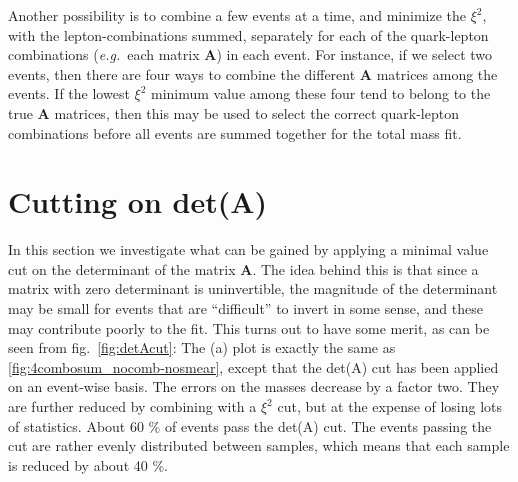 \documentclass[twoside,english]{uiofysmaster}
\begin{document}
Another possibility is to combine a few events at a time, and minimize the $\xi^2$, with the lepton-combinations summed, separately for each of the quark-lepton combinations ({\it e.g.}\ each matrix $\mathbf{A}$) in each event. For instance, if we select two events, then there are four ways to combine the different $\mathbf{A}$ matrices among the events. If the lowest $\xi^2$ minimum value among these four tend to belong to the true $\mathbf{A}$ matrices, then this may be used to select the correct quark-lepton combinations before all events are summed together for the total mass fit. 







\section{Cutting on det(A)}
In this section we investigate what can be gained by applying a minimal value cut on the determinant of the matrix $\mathbf{A}$. The idea behind this is that since a matrix with zero determinant is uninvertible, the magnitude of the determinant may be small for events that are ``difficult'' to invert in some sense, and these may contribute poorly to the fit. This turns out to have some merit, as can be seen from fig.\ \ref{fig:detAcut}: The (a) plot is exactly the same as \ref{fig:4combosum_nocomb-nosmear}, except that the det(A) cut has been applied on an event-wise basis. The errors on the masses decrease by a factor two. They are further reduced by combining with a $\xi^2$ cut, but at the expense of losing lots of statistics. About 60 \% of events pass the det(A) cut. The events passing the cut are rather evenly distributed between samples, which means that each sample is reduced by about 40 \%. 
\end{document}
